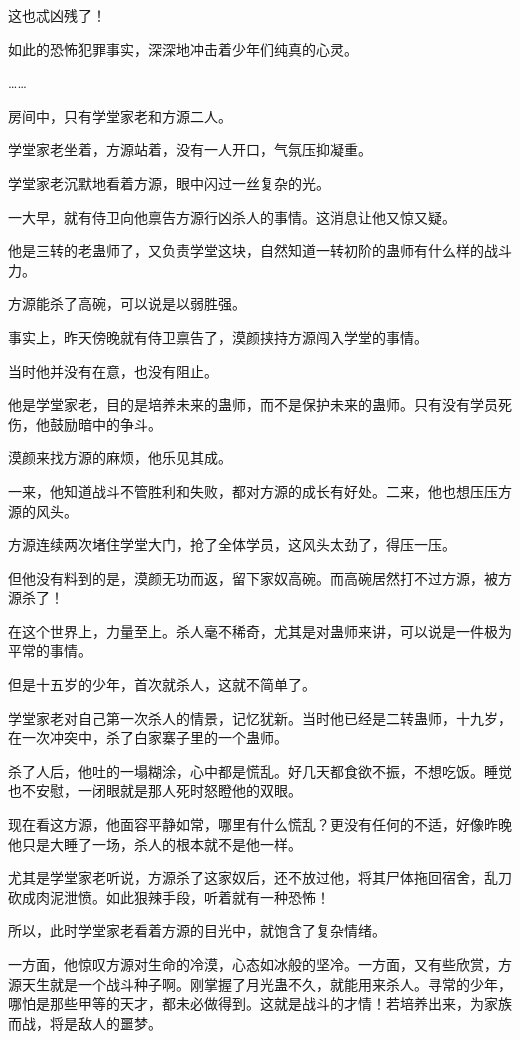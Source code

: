 \begin{this_body}
这也忒凶残了！

如此的恐怖犯罪事实，深深地冲击着少年们纯真的心灵。

……

房间中，只有学堂家老和方源二人。

学堂家老坐着，方源站着，没有一人开口，气氛压抑凝重。

学堂家老沉默地看着方源，眼中闪过一丝复杂的光。

一大早，就有侍卫向他禀告方源行凶杀人的事情。这消息让他又惊又疑。

他是三转的老蛊师了，又负责学堂这块，自然知道一转初阶的蛊师有什么样的战斗力。

方源能杀了高碗，可以说是以弱胜强。

事实上，昨天傍晚就有侍卫禀告了，漠颜挟持方源闯入学堂的事情。

当时他并没有在意，也没有阻止。

他是学堂家老，目的是培养未来的蛊师，而不是保护未来的蛊师。只有没有学员死伤，他鼓励暗中的争斗。

漠颜来找方源的麻烦，他乐见其成。

一来，他知道战斗不管胜利和失败，都对方源的成长有好处。二来，他也想压压方源的风头。

方源连续两次堵住学堂大门，抢了全体学员，这风头太劲了，得压一压。

但他没有料到的是，漠颜无功而返，留下家奴高碗。而高碗居然打不过方源，被方源杀了！

在这个世界上，力量至上。杀人毫不稀奇，尤其是对蛊师来讲，可以说是一件极为平常的事情。

但是十五岁的少年，首次就杀人，这就不简单了。

学堂家老对自己第一次杀人的情景，记忆犹新。当时他已经是二转蛊师，十九岁，在一次冲突中，杀了白家寨子里的一个蛊师。

杀了人后，他吐的一塌糊涂，心中都是慌乱。好几天都食欲不振，不想吃饭。睡觉也不安慰，一闭眼就是那人死时怒瞪他的双眼。

现在看这方源，他面容平静如常，哪里有什么慌乱？更没有任何的不适，好像昨晚他只是大睡了一场，杀人的根本就不是他一样。

尤其是学堂家老听说，方源杀了这家奴后，还不放过他，将其尸体拖回宿舍，乱刀砍成肉泥泄愤。如此狠辣手段，听着就有一种恐怖！

所以，此时学堂家老看着方源的目光中，就饱含了复杂情绪。

一方面，他惊叹方源对生命的冷漠，心态如冰般的坚冷。一方面，又有些欣赏，方源天生就是一个战斗种子啊。刚掌握了月光蛊不久，就能用来杀人。寻常的少年，哪怕是那些甲等的天才，都未必做得到。这就是战斗的才情！若培养出来，为家族而战，将是敌人的噩梦。


\end{this_body}
